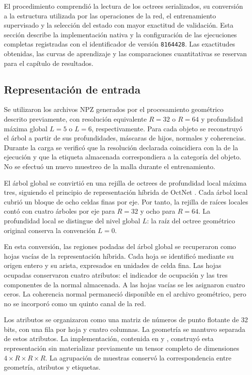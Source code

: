 El procedimiento comprendió la lectura de los octrees serializados, su conversión a la estructura utilizada por las operaciones de la red, el entrenamiento supervisado y la selección del estado con mayor exactitud de validación. Esta sección describe la implementación nativa y la configuración de las ejecuciones completas registradas con el identificador de versión \texttt{8164428}. Las exactitudes obtenidas, las curvas de aprendizaje y las comparaciones cuantitativas se reservan para el capítulo de resultados.

\subsection{Representación de entrada}
\label{subsec:net5-entrada}

Se utilizaron los archivos NPZ generados por el procesamiento geométrico descrito previamente, con resolución equivalente $R=32$ o $R=64$ y profundidad máxima global $L=5$ o $L=6$, respectivamente. Para cada objeto se reconstruyó el árbol a partir de sus profundidades, máscaras de hijos, normales y coherencias. Durante la carga se verificó que la resolución declarada coincidiera con la de la ejecución y que la etiqueta almacenada correspondiera a la categoría del objeto. No se efectuó un nuevo muestreo de la malla durante el entrenamiento.

El árbol global se convirtió en una rejilla de octrees de profundidad local máxima tres, siguiendo el principio de representación híbrida de OctNet \parencite{riegler2017}. Cada árbol local cubrió un bloque de ocho celdas finas por eje. Por tanto, la rejilla de raíces locales contó con cuatro árboles por eje para $R=32$ y ocho para $R=64$. La profundidad local se distingue del nivel global $L$: la raíz del octree geométrico original conserva la convención $L=0$.

En esta conversión, las regiones podadas del árbol global se recuperaron como hojas vacías de la representación híbrida. Cada hoja se identificó mediante su origen entero y su arista, expresados en unidades de celda fina. Las hojas ocupadas conservaron cuatro atributos: el indicador de ocupación y las tres componentes de la normal almacenada. A las hojas vacías se les asignaron cuatro ceros. La coherencia normal permaneció disponible en el archivo geométrico, pero no se incorporó como un quinto canal de la red.

Los atributos se organizaron como una matriz de números de punto flotante de 32 bits, con una fila por hoja y cuatro columnas. La geometría se mantuvo separada de estos atributos. La implementación, contenida en \protect{} y \protect{}, construyó esta representación sin materializar previamente un tensor completo de dimensiones $4\times R\times R\times R$. La agrupación de muestras conservó la correspondencia entre geometría, atributos y etiquetas.

